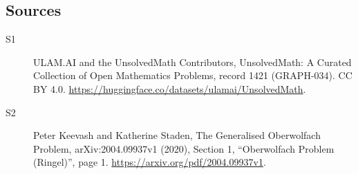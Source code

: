 \documentclass[11pt]{article}
\begin{document}
\subsection{Sources}
\begin{description}
\item[\hypertarget{source:1421:1}{S1}] ULAM.AI and the UnsolvedMath Contributors, UnsolvedMath: A Curated Collection of Open Mathematics Problems, record 1421 (GRAPH-034). CC BY 4.0. \url{https://huggingface.co/datasets/ulamai/UnsolvedMath}.
\item[\hypertarget{source:1421:2}{S2}] Peter Keevash and Katherine Staden, The Generalised Oberwolfach Problem, arXiv:2004.09937v1 (2020), Section 1, “Oberwolfach Problem (Ringel)”, page 1. \url{https://arxiv.org/pdf/2004.09937v1}.
\end{description}
\label{end:1421}
\end{document}
